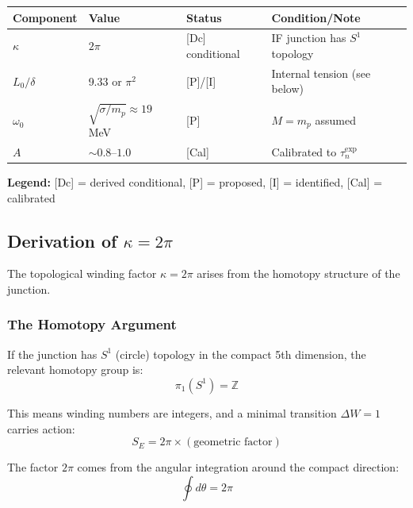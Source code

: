 \documentclass[11pt,a4paper]{article}
\begin{document}
\begin{tcolorbox}[colback=gray!10!white, colframe=gray!50!black, title=Epistemic Status of Components]
\begin{center}
\begin{tabular}{llll}
\toprule
\textbf{Component} & \textbf{Value} & \textbf{Status} & \textbf{Condition/Note} \\
\midrule
$\kappa$ & $2\pi$ & [Dc] conditional & IF junction has $S^1$ topology \\
$L_0/\delta$ & 9.33 or $\pi^2$ & [P]/[I] & Internal tension (see below) \\
$\omega_0$ & $\sqrt{\sigma/m_p} \approx 19$ MeV & [P] & $M = m_p$ assumed \\
$A$ & $\sim 0.8$--$1.0$ & [Cal] & Calibrated to $\tau_n^{\text{exp}}$ \\
\bottomrule
\end{tabular}
\end{center}
\vspace{0.5em}
\textbf{Legend:} [Dc] = derived conditional, [P] = proposed, [I] = identified, [Cal] = calibrated
\end{tcolorbox}

\subsection{Derivation of $\kappa = 2\pi$}

The topological winding factor $\kappa = 2\pi$ arises from the homotopy structure of the junction.

\subsubsection{The Homotopy Argument}

If the junction has $S^1$ (circle) topology in the compact 5th dimension, the relevant homotopy group is:
\begin{equation}
\pi_1(S^1) = \mathbb{Z}
\end{equation}

This means winding numbers are integers, and a minimal transition $\Delta W = 1$ carries action:
\begin{equation}
S_E = 2\pi \times (\text{geometric factor})
\end{equation}

The factor $2\pi$ comes from the angular integration around the compact direction:
\begin{equation}
\oint d\theta = 2\pi
\end{equation}
\end{document}
